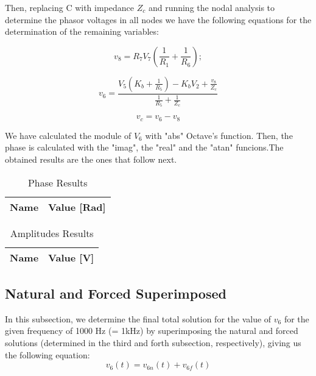 Then, replacing C with  impedance $Z_c$ and running the nodal analysis to determine the phasor voltages in all nodes we have the following equations for the determination of the remaining variables:\par

\begin{equation}
v_8 = R_7V_7(\frac{1}{R_1} + \frac{1}{R_6});
\label{eq:V_8}
\end{equation}

\begin{equation}
v_6 = \frac{V_5(K_b + \frac{1}{R_5}) - K_bV_2 + \frac{v_8}{Z_c}}{\frac{1}{R_5} + \frac{1}{Z_c}} 
\label{eq:V_6}
\end{equation}

\begin{equation}
v_c = v_6 - v_8
\label{eq:V_c}
\end{equation}

We have calculated the module of $V_6$ with "abs" Octave's function. Then, the phase is calculated with the "imag", the "real" and the "atan" funcions.The obtained results are the ones that follow next. \par

\begin{table}[H]
  \centering
  \begin{tabular}{|l|r|}
    \hline    
    {\bf Name} & {\bf Value [Rad]} \\ \hline
    
  \end{tabular}
  \caption{Phase Results}
  \label{tab:mat4}
\end{table}

\begin{table}[H]
  \centering
  \begin{tabular}{|l|r|}
    \hline    
    {\bf Name} & {\bf Value [V]} \\ \hline
    
  \end{tabular}
  \caption{Amplitudes Results}
  \label{tab:mat4a}
\end{table}


\subsection{Natural and Forced Superimposed}
In this subsection, we determine the final total solution for the value of $v_6$ for the given frequency of 1000 Hz (= 1kHz) by superimposing the natural and forced solutions (determined in the third and forth subsection, respectively), giving us the following equation:
\begin{equation}
v_6(t) = v_{6n}(t) + v_{6f}(t)
\label{eq:1.20}
\end{equation}

